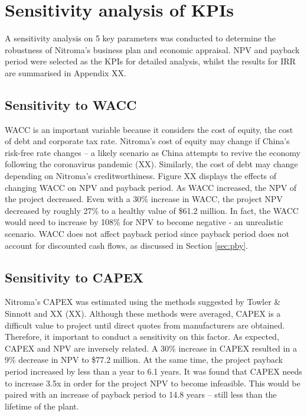 \section{Sensitivity analysis of KPIs}
A sensitivity analysis on 5 key parameters was conducted to determine the robustness of Nitroma’s business plan and economic appraisal. NPV and payback period were selected as the KPIs for detailed analysis, whilst the results for IRR are summarised in Appendix XX. 

\subsection{Sensitivity to WACC}
WACC is an important variable because it considers the cost of equity, the cost of debt and corporate tax rate. Nitroma’s cost of equity may change if China’s risk-free rate changes – a likely scenario as China attempts to revive the economy following the coronavirus pandemic (XX). Similarly, the cost of debt may change depending on Nitroma’s creditworthiness.  Figure XX displays the effects of changing WACC on NPV and payback period. As WACC increased, the NPV of the project decreased. Even with a 30\% increase in WACC, the project NPV decreased by roughly 27\% to a healthy value of \$61.2 million. In fact, the WACC would need to increase by 108\% for NPV to become negative - an unrealistic scenario. WACC does not affect payback period since payback period does not account for discounted cash flows, as discussed in Section \ref{sec:pby}. 

\subsection{Sensitivity to CAPEX}
Nitroma’s CAPEX was estimated using the methods suggested by Towler \& Sinnott and XX (XX). Although these methods were averaged, CAPEX is a difficult value to project until direct quotes from manufacturers are obtained. Therefore, it important to conduct a sensitivity on this factor. As expected, CAPEX and NPV are inversely related. A 30\% increase in CAPEX resulted in a 9\% decrease in NPV to \$77.2 million. At the same time, the project payback period increased by less than a year to 6.1 years. It was found that CAPEX needs to increase 3.5x in order for the project NPV to become infeasible. This would be paired with an increase of payback period to 14.8 years – still less than the lifetime of the plant.

